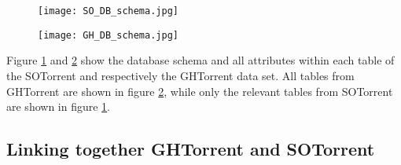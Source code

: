       
        \begin{figure}[!ht]
          \centering
          \texttt{[image: SO\_DB\_schema.jpg]}\\
          \label{fig:so_schema}
        \end{figure}
        
   
        \begin{figure}[!ht]
          \centering
          \texttt{[image: GH\_DB\_schema.jpg]}\\
          \label{fig:gh_schema}
        \end{figure}
        
        Figure \ref{fig:so_schema} and \ref{fig:gh_schema} show the database schema and all attributes within each table of the SOTorrent and respectively the GHTorrent data set. All tables from GHTorrent are shown in figure \ref{fig:gh_schema}, while only the relevant tables from SOTorrent are shown in figure \ref{fig:so_schema}. 


    \subsection{Linking together GHTorrent and SOTorrent}\label{Linking_SO_GH}
    
